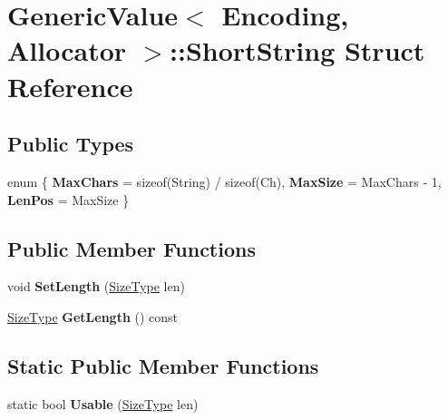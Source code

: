 \hypertarget{struct_generic_value_1_1_short_string}{}\section{Generic\+Value$<$ Encoding, Allocator $>$\+:\+:Short\+String Struct Reference}
\label{struct_generic_value_1_1_short_string}
\subsection*{Public Types}
\begin{DoxyCompactItemize}
\item 
enum \{ {\bfseries Max\+Chars} = sizeof(String) / sizeof(Ch), 
{\bfseries Max\+Size} = Max\+Chars -\/ 1, 
{\bfseries Len\+Pos} = Max\+Size
 \}\hypertarget{struct_generic_value_1_1_short_string_a03831b70f7449e4cf8a612b944fb332a}{}\label{struct_generic_value_1_1_short_string_a03831b70f7449e4cf8a612b944fb332a}

\end{DoxyCompactItemize}
\subsection*{Public Member Functions}
\begin{DoxyCompactItemize}
\item 
void {\bfseries Set\+Length} (\hyperlink{rapidjson_8h_a5ed6e6e67250fadbd041127e6386dcb5}{Size\+Type} len)\hypertarget{struct_generic_value_1_1_short_string_adbfe8461e0cb0ccb2cb3825489e743c2}{}\label{struct_generic_value_1_1_short_string_adbfe8461e0cb0ccb2cb3825489e743c2}

\item 
\hyperlink{rapidjson_8h_a5ed6e6e67250fadbd041127e6386dcb5}{Size\+Type} {\bfseries Get\+Length} () const \hypertarget{struct_generic_value_1_1_short_string_a65bea5171312b2243a1ec70ec6fa93cd}{}\label{struct_generic_value_1_1_short_string_a65bea5171312b2243a1ec70ec6fa93cd}

\end{DoxyCompactItemize}
\subsection*{Static Public Member Functions}
\begin{DoxyCompactItemize}
\item 
static bool {\bfseries Usable} (\hyperlink{rapidjson_8h_a5ed6e6e67250fadbd041127e6386dcb5}{Size\+Type} len)\hypertarget{struct_generic_value_1_1_short_string_a73e40f625c1abbd84f95ac7fff8365f7}{}\label{struct_generic_value_1_1_short_string_a73e40f625c1abbd84f95ac7fff8365f7}

\end{DoxyCompactItemize}
